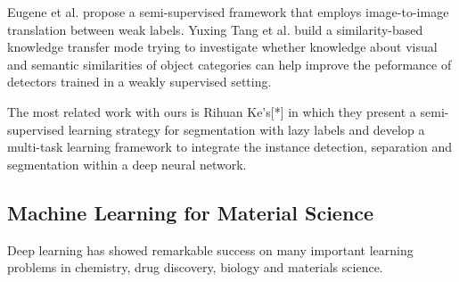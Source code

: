 \documentclass[10pt,twocolumn,letterpaper]{article}
\begin{document}

Eugene et al. propose a semi-supervised framework that employs image-to-image translation between weak labels.
Yuxing Tang et al. build a similarity-based knowledge transfer mode trying to investigate whether knowledge about visual and semantic similarities of object categories can help improve the peformance of detectors trained in a weakly supervised setting.

The most related work with ours is Rihuan Ke's[*] in which they present a semi-supervised learning strategy for segmentation with lazy labels and develop a multi-task learning framework to integrate the instance detection, separation and segmentation within a deep neural network.

\subsection{Machine Learning for Material Science}

Deep learning has showed remarkable success on many important 
learning problems in chemistry, drug discovery, biology and materials science.
\end{document}
